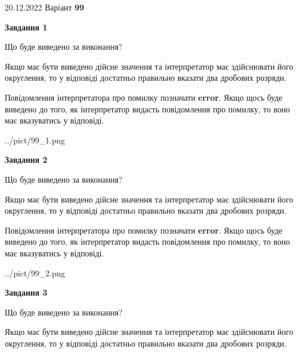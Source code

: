 \documentclass[12pt, ukrainian]{article}
\begin{document}
{20.12.2022 Варіант \No \textbf { 99 }\par}
{
\begin {Large}

{\begin {center}\textbf{Завдання 1}\end {center}}\par
Що буде виведено за виконання? \par

Якщо має бути виведено дійсне значення та інтерпретатор має здійснювати його округлення, 
то у відповіді достатньо правильно вказати два дробових розряди.

Повідомлення інтерпретатора про помилку позначати \textbf{error}.
Якщо щось буде виведено до того, як інтерпретатор видасть повідомлення про помилку, 
то воно має вказуватись у відповіді. \par

\begin{center}
	{../pict/99_1.png}
\end{center}
\newpage

{\begin {center}\textbf{Завдання 2}\end {center}}\par
Що буде виведено за виконання? \par

Якщо має бути виведено дійсне значення та інтерпретатор має здійснювати його округлення, 
то у відповіді достатньо правильно вказати два дробових розряди.

Повідомлення інтерпретатора про помилку позначати \textbf{error}.
Якщо щось буде виведено до того, як інтерпретатор видасть повідомлення про помилку, 
то воно має вказуватись у відповіді. \par

\begin{center}
	{../pict/99_2.png}
\end{center}
\newpage

{\begin {center}\textbf{Завдання 3}\end {center}}\par
Що буде виведено за виконання? \par

Якщо має бути виведено дійсне значення та інтерпретатор має здійснювати його округлення, 
то у відповіді достатньо правильно вказати два дробових розряди.


\end{Large}}
\end{document}
